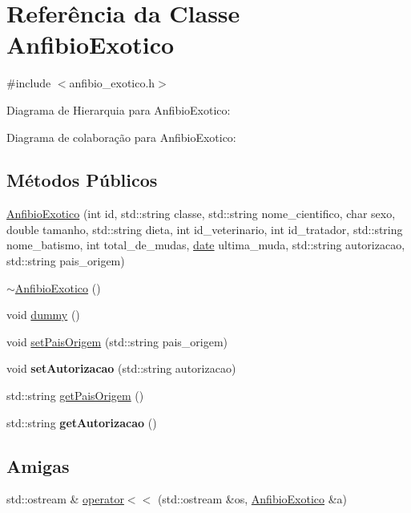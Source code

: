 \hypertarget{classAnfibioExotico}{}\section{Referência da Classe Anfibio\+Exotico}
\label{classAnfibioExotico}


{\ttfamily \#include $<$anfibio\+\_\+exotico.\+h$>$}



Diagrama de Hierarquia para Anfibio\+Exotico\+:


Diagrama de colaboração para Anfibio\+Exotico\+:
\subsection*{Métodos Públicos}
\begin{DoxyCompactItemize}
\item 
\hyperlink{classAnfibioExotico_a7267ae2ab0422f796970751b7fa180e0}{Anfibio\+Exotico} (int id, std\+::string classe, std\+::string nome\+\_\+cientifico, char sexo, double tamanho, std\+::string dieta, int id\+\_\+veterinario, int id\+\_\+tratador, std\+::string nome\+\_\+batismo, int total\+\_\+de\+\_\+mudas, \hyperlink{classdate}{date} ultima\+\_\+muda, std\+::string autorizacao, std\+::string pais\+\_\+origem)
\item 
\hyperlink{classAnfibioExotico_a2615151a98a1713a0d8c65d97bccd813}{$\sim$\+Anfibio\+Exotico} ()
\item 
void \hyperlink{classAnfibioExotico_a192645b6588bc584145f70be14862d77}{dummy} ()
\item 
void \hyperlink{classAnfibioExotico_a239fa1e80542aa344cf7c59b6d339f09}{set\+Pais\+Origem} (std\+::string pais\+\_\+origem)
\item 
\mbox{\label{classAnfibioExotico_aaffdf731e738997ff6eaefc12b056b6d}} 
void {\bfseries set\+Autorizacao} (std\+::string autorizacao)
\item 
std\+::string \hyperlink{classAnfibioExotico_a864e2e4005b93d7a74bb28596538d847}{get\+Pais\+Origem} ()
\item 
\mbox{\label{classAnfibioExotico_a0aa7dd38b9453f96ab9be32180449688}} 
std\+::string {\bfseries get\+Autorizacao} ()
\end{DoxyCompactItemize}
\subsection*{Amigas}
\begin{DoxyCompactItemize}
\item 
std\+::ostream \& \hyperlink{classAnfibioExotico_a507427d0ea4ae82dfbf7aefba2d1502c}{operator$<$$<$} (std\+::ostream \&os, \hyperlink{classAnfibioExotico}{Anfibio\+Exotico} \&a)
\end{DoxyCompactItemize}
